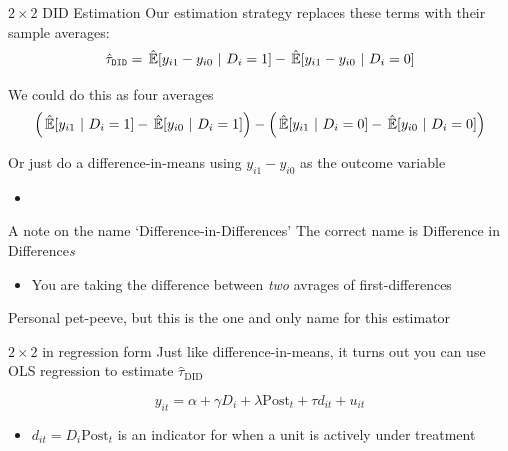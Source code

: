 \documentclass[aspectratio=169,t,11pt,table]{beamer}
\begin{document}
\begin{frame}{$2 \times 2$ DID Estimation}
  Our estimation strategy replaces these terms with their sample averages:
  $$
    \hat{\tau}_{\texttt{DID}} = \expechat{y_{i1} - y_{i0}}{D_i = 1} - \expechat{y_{i1} - y_{i0}}{D_i = 0}
  $$

  \bigskip
  We could do this as four averages
  $$
    \left(\expechat{y_{i1}}{D_i = 1} - \expechat{y_{i0}}{D_i = 1}\right) - \left(\expechat{y_{i1}}{D_i = 0} - \expechat{y_{i0}}{D_i = 0} \right)
  $$

  \pause
  \bigskip
  Or just do a difference-in-means using $y_{i1} - y_{i0}$ as the outcome variable
  \begin{itemize}
    \item {}
  \end{itemize}
\end{frame}

\begin{frame}{A note on the name `Difference-in-Differences'}
  The correct name is Difference in Difference\emph{s}
  \begin{itemize}
    \item You are taking the difference between \emph{two} avrages of first-differences
  \end{itemize}

  \bigskip
  Personal pet-peeve, but this is the one and only name for this estimator
\end{frame}

\begin{frame}{$2 \times 2$ in regression form}
  Just like difference-in-means, it turns out you can use OLS regression to estimate $\hat{\tau}_{\text{DID}}$

  $$
    y_{it} = \alpha + \gamma D_i + \lambda \text{Post}_t + \tau d_{it} + u_{it}
  $$
  \begin{itemize}
    \item $d_{it} = D_i \text{Post}_t$ is an indicator for when a unit is actively under treatment
  \end{itemize}

\end{frame}
\end{document}
